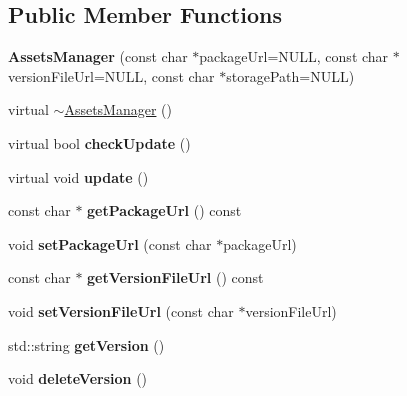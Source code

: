 \subsection*{Public Member Functions}
\begin{DoxyCompactItemize}
\item 
\mbox{\label{classAssetsManager_a9104b270065e041b92c404bca70f80d9}} 
{\bfseries Assets\+Manager} (const char $\ast$package\+Url=N\+U\+LL, const char $\ast$version\+File\+Url=N\+U\+LL, const char $\ast$storage\+Path=N\+U\+LL)
\item 
virtual \hyperlink{classAssetsManager_aa3edb24b073adecfb1281d9caa5896d2}{$\sim$\+Assets\+Manager} ()
\item 
\mbox{\label{classAssetsManager_a36e4937618db2017943decb61c692c43}} 
virtual bool {\bfseries check\+Update} ()
\item 
\mbox{\label{classAssetsManager_ae1205174d0af054719de654282c047e8}} 
virtual void {\bfseries update} ()
\item 
\mbox{\label{classAssetsManager_a7682a348774aab39a87ec993aef9689d}} 
const char $\ast$ {\bfseries get\+Package\+Url} () const
\item 
\mbox{\label{classAssetsManager_aa5234577a726a8ebf5bd56b4369ba647}} 
void {\bfseries set\+Package\+Url} (const char $\ast$package\+Url)
\item 
\mbox{\label{classAssetsManager_a7254ac579f635e5eccb77c0ee684ac6e}} 
const char $\ast$ {\bfseries get\+Version\+File\+Url} () const
\item 
\mbox{\label{classAssetsManager_a3048ff13ed5b96c9f15773e765d2037d}} 
void {\bfseries set\+Version\+File\+Url} (const char $\ast$version\+File\+Url)
\item 
\mbox{\label{classAssetsManager_aecb93254b1eb900d6f72817b6923ba31}} 
std\+::string {\bfseries get\+Version} ()
\item 
\mbox{\label{classAssetsManager_a73f93d30f3dd699558e25b07d42cf648}} 
void {\bfseries delete\+Version} ()

\end{DoxyCompactItemize}
